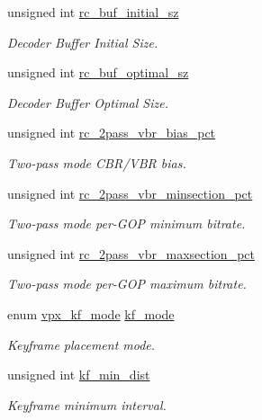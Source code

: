 \begin{DoxyCompactItemize}
unsigned int \hyperlink{structvpx__codec__enc__cfg_aa9e4d6405994ef42d61d478cf6e0d5e0}{rc\+\_\+buf\+\_\+initial\+\_\+sz}
\begin{DoxyCompactList}\small\item\em Decoder Buffer Initial Size. \end{DoxyCompactList}\item 
unsigned int \hyperlink{structvpx__codec__enc__cfg_aafde485867e040a58504ad796e79e47f}{rc\+\_\+buf\+\_\+optimal\+\_\+sz}
\begin{DoxyCompactList}\small\item\em Decoder Buffer Optimal Size. \end{DoxyCompactList}\item 
unsigned int \hyperlink{structvpx__codec__enc__cfg_a21c21ff097890dc3a450731c9b504cf4}{rc\+\_\+2pass\+\_\+vbr\+\_\+bias\+\_\+pct}
\begin{DoxyCompactList}\small\item\em Two-\/pass mode C\+B\+R/\+V\+BR bias. \end{DoxyCompactList}\item 
unsigned int \hyperlink{structvpx__codec__enc__cfg_a21eb9fce0844ae07b617bf3f0a25f5a5}{rc\+\_\+2pass\+\_\+vbr\+\_\+minsection\+\_\+pct}
\begin{DoxyCompactList}\small\item\em Two-\/pass mode per-\/\+G\+OP minimum bitrate. \end{DoxyCompactList}\item 
unsigned int \hyperlink{structvpx__codec__enc__cfg_ab5212050b71b2d9f4dc663caa496949e}{rc\+\_\+2pass\+\_\+vbr\+\_\+maxsection\+\_\+pct}
\begin{DoxyCompactList}\small\item\em Two-\/pass mode per-\/\+G\+OP maximum bitrate. \end{DoxyCompactList}\item 
enum \hyperlink{group__encoder_ga9f461802aa4db35c04a8b23837987f40}{vpx\+\_\+kf\+\_\+mode} \hyperlink{structvpx__codec__enc__cfg_a491d67f061dcdb13f60c017563e9d788}{kf\+\_\+mode}
\begin{DoxyCompactList}\small\item\em Keyframe placement mode. \end{DoxyCompactList}\item 
unsigned int \hyperlink{structvpx__codec__enc__cfg_a0a7b5444ecb09745cbe8d5af17553846}{kf\+\_\+min\+\_\+dist}
\begin{DoxyCompactList}\small\item\em Keyframe minimum interval. \end{DoxyCompactList}\item 

\end{DoxyCompactItemize}
